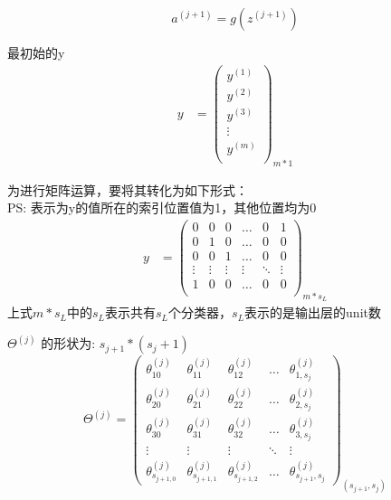 \begin{equation}
	a^{(j+1)} = g(z^{(j+1)})
\end{equation}

最初始的y
\begin{equation} \begin{aligned}
	y & = \left(\begin{matrix}
			y^{(1)} \\ y^{(2)} \\ y^{(3)} \\ \vdots \\ y^{(m)} \\
		\end{matrix}\right)_{m*1}
\end{aligned} \end{equation}

为进行矩阵运算，要将其转化为如下形式：\\
PS: 表示为y的值所在的索引位置值为1，其他位置均为0
\begin{equation}\begin{aligned}
	y &= \left(\begin{matrix}
	        0 & 0 & 0 & \dots & 0 & 1 \\
	        0 & 1 & 0 & \dots & 0 & 0 \\
	        0 & 0 & 1 & \dots & 0 & 0 \\
	        \vdots & \vdots & \vdots & \vdots & \ddots & \vdots \\
	        1 & 0 & 0 & \dots & 0 & 0 \\
		\end{matrix}\right)_{m*s_L}
\end{aligned}\end{equation}
上式$m*s_L$中的$s_L$表示共有$s_L$个分类器，$s_L$表示的是输出层的unit数




$\Theta^{(j)}$ 的形状为: $s_{j+1}*(s_j+1)$ \\

\begin{equation}
\Theta^{(j)} = 
	\left(\begin{matrix}
		\theta_{10}^{(j)} & \theta_{11}^{(j)} & \theta_{12}^{(j)} & \dots & \theta_{1,s_j}^{(j)} \\
		\theta_{20}^{(j)} & \theta_{21}^{(j)} & \theta_{22}^{(j)} & \dots & \theta_{2,s_j}^{(j)} \\
		\theta_{30}^{(j)} & \theta_{31}^{(j)} & \theta_{32}^{(j)} & \dots & \theta_{3,s_j}^{(j)} \\
		\vdots    & \vdots    & \vdots    & \ddots & \vdots   \\
		\theta_{s_{j+1,0}}^{(j)} & \theta_{s_{j+1,1}}^{(j)} & \theta_{s_{j+1,2}}^{(j)} & \dots & \theta_{s_{j+1},s_j}^{(j)}
	\end{matrix}\right)_{(s_{j+1},s_j)}
\end{equation}






